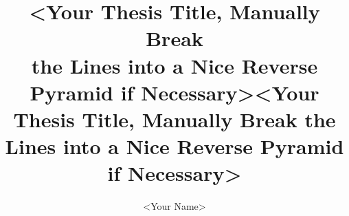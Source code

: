 \documentclass[english,nohyphen]{GayaUKM}
\title{<Your Thesis Title, Manually Break\protect\\the Lines into a Nice Reverse\protect\\Pyramid if Necessary>}
\author{<Your Name>}  %
\begin{document}
\makecoverpage

\title{<Your Thesis Title, Manually Break the Lines into a Nice Reverse Pyramid if Necessary>}
\maketitlepage


\frontmatter
\declaration








\tableofcontents
\listoffigures
\listoftables




\mainmatter








\appendix


\end{document}
